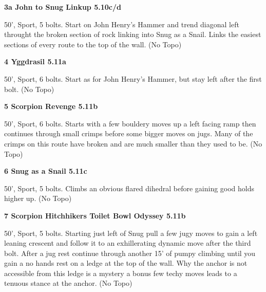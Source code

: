 \begin{multicols}{2}
\begin{adjustwidth}{0.5cm}{}
\needspace{1.5cm}
\label{vr:John to Snug Linkup}
\colorbox{RoyalBlue!20}{
\parbox{0.95\linewidth}{
\textbf{
3a John to Snug Linkup 5.10c/d  
}}}
\begin{adjustwidth}{0.5cm}{}			
50', Sport, 5 bolts. Start on John Henry's Hammer and trend diagonal left throught the broken section of rock linking into Snug as a Snail. Links the easiest sections of every route to the top of the wall.
  (No Topo)
\end{adjustwidth}



\end{adjustwidth}


\needspace{1.5cm}
\label{rt:Yggdrasil}
\colorbox{RoyalBlue!20}{
\parbox{0.95\linewidth}{
\textbf{
4 Yggdrasil 5.11a  
}}}
\begin{adjustwidth}{0.5cm}{}			
50', Sport, 6 bolts. Start as for John Henry's Hammer, but stay left after the first bolt.
  (No Topo)
\end{adjustwidth}




\needspace{1.5cm}
\label{rt:Scorpion Revenge}
\colorbox{RoyalBlue!20}{
\parbox{0.95\linewidth}{
\textbf{
5 Scorpion Revenge 5.11b  
}}}
\begin{adjustwidth}{0.5cm}{}			
50', Sport, 6 bolts. Starts with a few bouldery moves up a left facing ramp then continues through small crimps before some bigger moves on jugs. Many of the crimps on this route have broken and are much smaller than they used to be.
  (No Topo)
\end{adjustwidth}




\needspace{1.5cm}
\label{rt:Snug as a Snail}
\colorbox{RoyalBlue!20}{
\parbox{0.95\linewidth}{
\textbf{
6 Snug as a Snail 5.11c  
}}}
\begin{adjustwidth}{0.5cm}{}			
50', Sport, 5 bolts. Climbs an obvious flared dihedral before gaining good holds higher up.
  (No Topo)
\end{adjustwidth}




\needspace{1.5cm}
\label{rt:Scorpion Hitchhikers Toilet Bowl Odyssey}
\colorbox{RoyalBlue!20}{
\parbox{0.95\linewidth}{
\textbf{
7 Scorpion Hitchhikers Toilet Bowl Odyssey 5.11b  
}}}
\begin{adjustwidth}{0.5cm}{}			
50', Sport, 5 bolts. Starting just left of Snug pull a few jugy moves to gain a left leaning crescent and follow it to an exhillerating dynamic move after the third bolt. After a jug rest continue through another 15' of pumpy climbing until you gain a no hands rest on a ledge at the top of the wall. Why the anchor is not accessible from this ledge is a mystery a bonus few techy moves leads to a tenuous stance at the anchor.
  (No Topo)
\end{adjustwidth}





\end{multicols}
